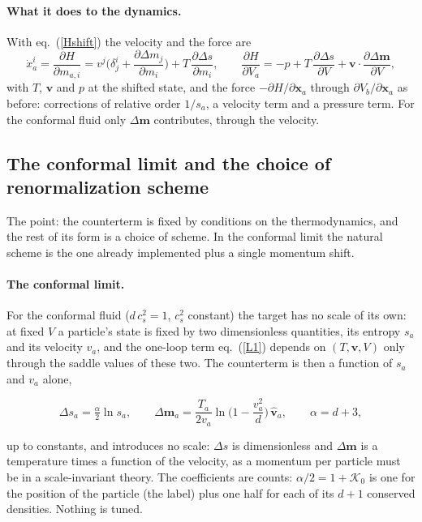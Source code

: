 \documentclass[11pt,aps,preprint,nofootinbib,superscriptaddress,tightenlines]{revtex4-2}
\def\st{\begin{equation}}
\def\stp{\end{equation}}
\def\Eq#1{eq.~(\ref{#1})}
\let\oldparagraph\paragraph
\renewcommand{\paragraph}{\par\bigskip\oldparagraph}
\begin{document}
\paragraph{What it does to the dynamics.}  With \Eq{Hshift} the velocity and the force are
\st
\dot x_a^i=\frac{\partial H}{\partial m_{a,i}}=v^j\Big(\delta^i_j+\frac{\partial\Delta m_j}{\partial m_i}\Big)+T\,\frac{\partial\Delta s}{\partial m_i},\qquad
\frac{\partial H}{\partial V_a}=-p+T\,\frac{\partial\Delta s}{\partial V}+\bm v\cdot\frac{\partial\Delta\bm m}{\partial V} ,
\stp
with $T$, $\bm v$ and $p$ at the shifted state, and the force $-\partial H/\partial\bm x_a$ through $\partial V_b/\partial\bm x_a$ as before: corrections of relative order $1/s_a$, a velocity
term and a pressure term.  For the conformal fluid only $\Delta\bm m$ contributes, through the velocity.

\subsection{The conformal limit and the choice of renormalization scheme}
\label{sec:scheme}

The point: the counterterm is fixed by conditions on the thermodynamics, and the rest of its form is a choice of scheme.  In the conformal limit the natural scheme
is the one already implemented plus a single momentum shift.

\paragraph{The conformal limit.}  For the conformal fluid ($d\,c_s^2=1$, $c_s^2$ constant) the target has no scale of its own: at fixed $V$ a particle's state is fixed by two
dimensionless quantities, its entropy $s_a$ and its velocity $v_a$, and the one-loop term \Eq{L1} depends on $(T,\bm v,V)$ only through the saddle values of these two.  The
counterterm is then a function of $s_a$ and $v_a$ alone,
\begin{keyeq}
\st
\Delta s_a=\tfrac\alpha2\ln s_a,\qquad \Delta\bm m_a=\frac{T_a}{2v_a}\ln\Big(1-\frac{v_a^2}d\Big)\,\hat{\bm v}_a,\qquad \alpha=d+3 ,
\label{ctconformal}
\stp
\end{keyeq}
up to constants, and introduces no scale: $\Delta s$ is dimensionless and $\Delta\bm m$ is a temperature times a function of the velocity, as a momentum per particle must be in a
scale-invariant theory.  The coefficients are counts: $\alpha/2=1+\mathcal K_0$ is one for the position of the particle (the label) plus one half for each of its $d+1$ conserved densities.  Nothing
is tuned.
\end{document}
